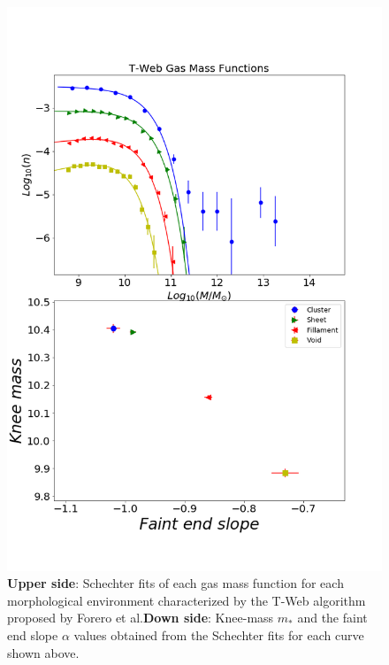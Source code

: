 \documentclass[a4paper,fleqn,usenatbib]{mnras}
\begin{document}
\begin{figure}
	\includegraphics[width=\columnwidth]{./pics/T-Web_Gas.png}
    \caption{\textbf{Upper side}: Schechter fits of each gas mass
      function for each morphological environment characterized by the
      T-Web algorithm proposed by Forero et al.\textbf{Down side}:
      Knee-mass $m_\ast$ and the faint end slope $\alpha$ values
      obtained from the Schechter fits for each curve shown above.} 
    \label{fig:TwebGas}
\end{figure}
\end{document}

